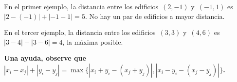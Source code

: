 \explanationText

En el primer ejemplo, la distancia entre los edificios~$(2, -1)$ y~$(-1, 1)$
es~$|2 - (- 1)| + |-1 - 1| = 5$. No hay un par de edificios a mayor distancia.

En el tercer ejemplo, la distancia entre los edificios~$(3, 3)$ y~$(4, 6)$
es~$|3 - 4| + |3 - 6| = 4$, la máxima posible.

\textbf{Una ayuda, observe que~$|x_i - x_j| + |y_i - y_j| = \max \{|x_i + y_i - (x_j + y_j)|, |x_i - y_i - (x_j -
y_j)| \}$.}
